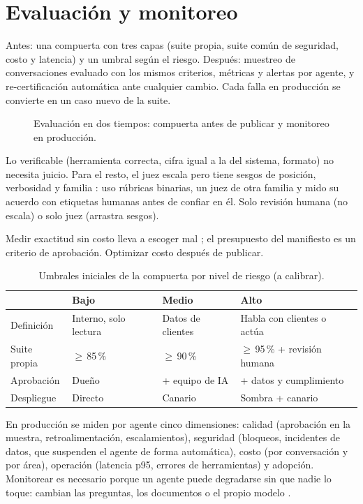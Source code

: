 \section{Evaluación y monitoreo}
\label{sec:eval}
\begin{respuesta}
Antes: una compuerta con tres capas (suite propia, suite común de seguridad, costo y
latencia) y un umbral según el riesgo. Después: muestreo de conversaciones evaluado con los
mismos criterios, métricas y alertas por agente, y re-certificación automática ante cualquier
cambio. Cada falla en producción se convierte en un caso nuevo de la suite.
\end{respuesta}

\begin{figure}[!htbp]
  \centering
  
  \caption{Evaluación en dos tiempos: compuerta antes de publicar y monitoreo en producción.}
  \label{fig:evaluacion}
\end{figure}

{Lo verificable (herramienta correcta, cifra igual a la del sistema, formato) no necesita
juicio. Para el resto, el juez escala pero tiene sesgos de posición, verbosidad y familia
\citep{zheng2023judge}: uso rúbricas binarias, un juez de otra familia y mido su
acuerdo con etiquetas humanas antes de confiar en él.}
{Solo revisión humana (no escala) o solo juez (arrastra sesgos).}

{Medir exactitud sin costo lleva a escoger mal \citep{kapoor2024agents}; el presupuesto del
manifiesto es un criterio de aprobación.}
{Optimizar costo después de publicar.}

\begin{table}[!htbp]
\centering\small
\caption{Umbrales iniciales de la compuerta por nivel de riesgo (a calibrar).}
\label{tab:umbrales}
\renewcommand{\arraystretch}{1.1}
\begin{tabularx}{\textwidth}{@{}L{2.3cm}YYY@{}}
\toprule
& \textbf{Bajo} & \textbf{Medio} & \textbf{Alto}\\
\midrule
Definición & Interno, solo lectura & Datos de clientes & Habla con clientes o actúa\\
Suite propia & $\geq$\,85\,\% & $\geq$\,90\,\% & $\geq$\,95\,\% + revisión humana\\
Aprobación & Dueño & + equipo de IA & + datos y cumplimiento\\
Despliegue & Directo & Canario & Sombra + canario\\
\bottomrule
\end{tabularx}
\end{table}

En producción se miden por agente cinco dimensiones: calidad (aprobación en la muestra,
retroalimentación, escalamientos), seguridad (bloqueos, incidentes de datos, que suspenden
el agente de forma automática), costo (por conversación y por área), operación (latencia
p95, errores de herramientas) y adopción. Monitorear es necesario porque un agente puede
degradarse sin que nadie lo toque: cambian las preguntas, los documentos o el propio modelo
\citep{chen2024drift}.
